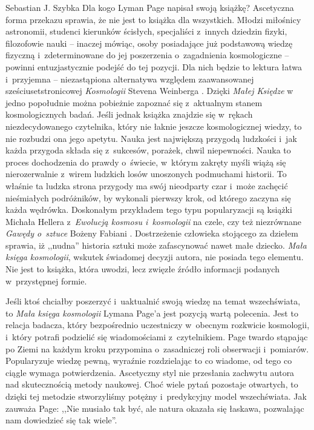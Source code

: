 \begin{newrevplenv}{Sebastian J. Szybka}
Dla kogo Lyman Page napisał swoją książkę? Ascetyczna forma przekazu sprawia, że nie jest to książka dla wszystkich. Młodzi miłośnicy astronomii, studenci kierunków ścisłych, specjaliści z~innych dziedzin fizyki, filozofowie nauki -- inaczej mówiąc, osoby posiadające już podstawową wiedzę fizyczną i~zdeterminowane do jej poszerzenia o~zagadnienia kosmologiczne -- powinni entuzjastycznie podejść do tej pozycji. Dla nich będzie to lektura łatwa i~przyjemna -- niezastąpiona alternatywa względem zaawansowanej sześciusetstronicowej \textit{Kosmologii} Stevena Weinberga
\parencite*[][]{weinberg_cosmology_2008}. %
 Dzięki \textit{Małej Księdze} w jedno popołudnie można pobieżnie zapoznać się z~aktualnym stanem kosmologicznych badań. Jeśli jednak książka znajdzie się w~rękach niezdecydowanego czytelnika, który nie łaknie jeszcze kosmologicznej wiedzy, to nie rozbudzi ona jego apetytu. Nauka jest największą przygodą ludzkości i~jak każda przygoda składa się z~sukcesów, porażek, chwil niepewności. Nauka to proces dochodzenia do prawdy o~świecie, w~którym zakręty myśli wiążą się nierozerwalnie z~wirem ludzkich losów unoszonych podmuchami historii. To właśnie ta ludzka strona przygody ma swój nieodparty czar i~może zachęcić nieśmiałych podróżników, by wykonali pierwszy krok, od którego zaczyna się każda wędrówka. Doskonałym przykładem tego typu popularyzacji są książki Michała Hellera z~\textit{Ewolucją kosmosu i~kosmologii} \parencite*{heller_ewolucja} na czele, czy też niezrównane \textit{Gawędy o~sztuce} Bożeny Fabiani \parencite*[zob. np.][]{fabiani_gawedy}. Dostrzeżenie człowieka stojącego za dziełem sprawia, iż ,,nudna'' historia sztuki może zafascynować nawet małe dziecko. \textit{Mała księga kosmologii}, wskutek świadomej decyzji autora, nie posiada tego elementu. Nie jest to książka, która uwodzi, lecz zwięzłe źródło informacji podanych w~przystępnej formie.

Jeśli ktoś chciałby poszerzyć i~uaktualnić swoją wiedzę na temat wszechświata, to \textit{Mała księga kosmologii} Lymana Page'a jest pozycją wartą polecenia. Jest to relacja badacza, który bezpośrednio uczestniczy w~obecnym rozkwicie kosmologii, i~który potrafi podzielić się wiadomościami z~czytelnikiem. Page twardo stąpając po Ziemi na każdym kroku przypomina o~zasadniczej roli obserwacji i~pomiarów. Popularyzuje wiedzę pewną, wyraźnie rozdzielając to co wiadome, od tego co ciągle wymaga potwierdzenia. Ascetyczny styl nie przesłania zachwytu autora nad skutecznością metody naukowej. Choć wiele pytań pozostaje otwartych, to dzięki tej metodzie stworzyliśmy potężny i~predykcyjny model wszechświata. Jak zauważa Page: ,,Nie musiało tak być, ale natura okazała się łaskawa, pozwalając nam dowiedzieć się tak wiele''.


\end{newrevplenv}
